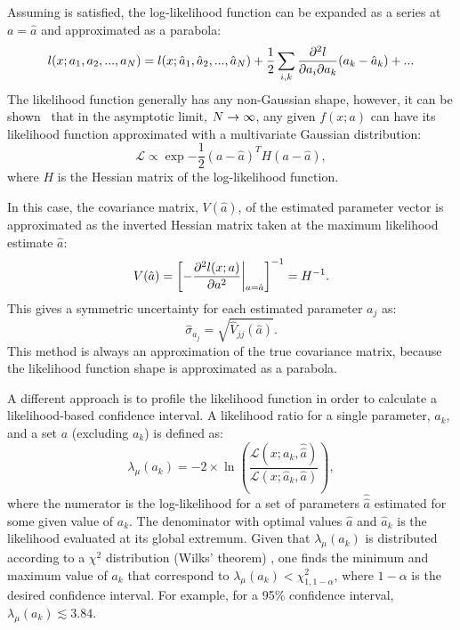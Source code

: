 Assuming  is satisfied, the log-likelihood function can be expanded as a series at $a=\hat{a}$ and approximated as a parabola:
\begin{equation}
    l(x;a_1,a_2,...,a_N) = l(x;\hat{a}_1,\hat{a}_2,...,\hat{a}_N) + \frac{1}{2}\sum_{i,k} \pdv{l}{a_i}{a_k} (a_i-\hat{a}_i)(a_k-\hat{a}_k)+...
\end{equation}
The likelihood function generally has any non-Gaussian shape, however, it can be shown~\cite{James_2006} that in the asymptotic limit, $N\rightarrow\infty$, 
any given $f(x;a)$ can have its likelihood function approximated with a multivariate Gaussian distribution:
\begin{equation}
    \mathcal{L} \propto \exp{-\frac{1}{2}(a-\hat{a})^T H(a-\hat{a})},
\end{equation}
where $H$ is the Hessian matrix of the log-likelihood function. 

In this case, the covariance matrix, $V(\hat{a})$, of the estimated parameter vector is approximated as the inverted Hessian matrix taken at the maximum likelihood estimate $\hat{a}$:
\begin{equation}
    V(\hat{a}) = \left[-\pdv[2]{l(x;a)}{a}\middle|^{}_{\ds a=\hat{a}}\right]^{-1} = H^{-1}.
\end{equation}
This gives a symmetric uncertainty for each estimated parameter $a_j$ as:
\begin{equation}
    \hat{\sigma}_{a_j} = \sqrt{\hat{V}_{jj}(\hat{a})}.
\end{equation}
This method is always an approximation of the true covariance matrix, because the likelihood function shape is approximated as a parabola.

A different approach is to profile the likelihood function in order to calculate a likelihood-based confidence interval.
A likelihood ratio for a single parameter, $a_k$, and a set $a$ (excluding $a_k$) is defined as:
\begin{equation}\label{eq:profile}
    \lambda_{\mu}(a_k) = -2 \times \ln\left(\frac{\mathcal{L}(x;a_k,\hat{\hat{a}})}{\mathcal{L}(x;\hat{a}_k,\hat{a})}\right),
\end{equation} 
where the numerator is the log-likelihood for a set of parameters $\hat{\hat{a}}$ estimated for some given value of $a_k$.
The denominator with optimal values $\hat{a}$ and $\hat{a}_k$ is the likelihood evaluated at its global extremum. 
Given that $\lambda_{\mu}(a_k)$ is distributed according to a $\chi^2$ distribution (Wilks' theorem) \cite{Wilks:1938dza},
one finds the minimum and maximum value of $a_k$ that correspond to $\lambda_{\mu}(a_k)<\chi^2_{1,1-\alpha}$, where $1-\alpha$ is the desired confidence interval.
For example, for a 95\% confidence interval, $\lambda_{\mu}(a_k)\lesssim3.84$.

